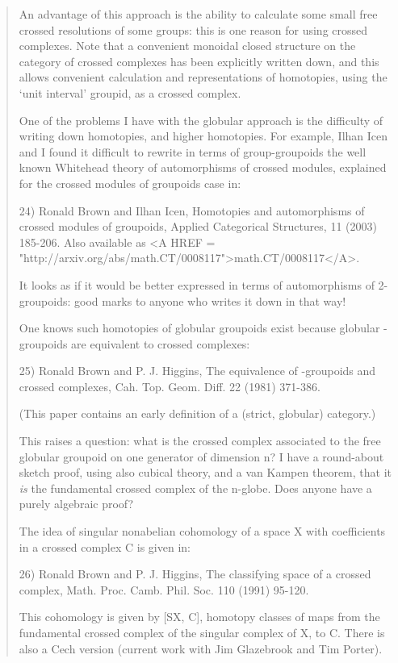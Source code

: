 \begin{quote}
 An advantage of this approach is the ability to calculate some small
 free crossed resolutions of some groups: this is one reason for using
 crossed complexes.  Note that a convenient monoidal closed structure on
 the category of crossed complexes has been explicitly written down, and
 this allows convenient calculation and representations of homotopies,
 using the `unit interval' groupid, as a crossed complex.

 One of the problems I have with the globular approach is the difficulty
 of writing down homotopies, and higher homotopies.  For example, Ilhan
 Icen and I found it difficult to rewrite in terms of group-groupoids the
 well known Whitehead theory of automorphisms of crossed modules,
 explained for the crossed modules of groupoids case in:

24) 
Ronald Brown and Ilhan Icen, 
Homotopies and automorphisms of crossed modules
 of groupoids, Applied Categorical Structures, 11 (2003) 185-206.
 Also available as <A HREF = "http://arxiv.org/abs/math.CT/0008117">math.CT/0008117</A>.

 It looks as if it would be better expressed in terms of automorphisms of
 2-groupoids: good marks to anyone who writes it down in that way!

 One knows such homotopies of globular \infty  groupoids exist because
 globular \infty -groupoids are equivalent to crossed complexes:

25) 
Ronald Brown and P. J. Higgins, 
The equivalence of \infty -groupoids and
 crossed complexes, Cah. Top. Geom. Diff. 22 (1981) 371-386.

 (This paper contains an early definition of a (strict, globular)
 \infty  category.)

 This raises a question: what is the crossed complex associated to the
 free globular groupoid on one generator of dimension n?  I have a
 round-about sketch proof, using also cubical theory, and a van Kampen
 theorem, that it \emph{is} the fundamental crossed complex of the n-globe.
 Does anyone have a purely algebraic proof?
 
 The idea of singular nonabelian cohomology of a space X with
 coefficients in a crossed complex C is given in:

26) Ronald Brown and 
P. J. Higgins, The classifying space of a crossed complex,
 Math. Proc. Camb. Phil. Soc. 110 (1991) 95-120.

 This cohomology is given by [\Pi SX, C], homotopy classes of maps from
 the fundamental crossed complex of the singular complex of X, to C.
 There is also a Cech version (current work with Jim Glazebrook and Tim
 Porter).


\end{quote}
